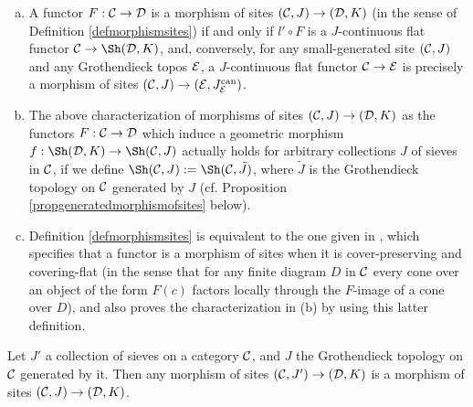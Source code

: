 \documentclass[a4paper,12pt]{article}
\begin{document}
\begin{remarks}\label{remmorphismsofsites}
	\begin{enumerate}[(a)]
		\item A functor $F:{\cal C}\to {\cal D}$ is a morphism of sites $({\cal C}, J)\to ({\cal D}, K)$ (in the sense of Definition \ref{defmorphismsites}) if and only if $l'\circ F$ is a $J$-continuous flat functor ${\cal C}\to \Sh({\cal D}, K)$, and, conversely, for any small-generated site $({\cal C}, J)$ and any Grothendieck topos $\cal E$, a $J$-continuous flat functor ${\cal C}\to {\cal E}$ is precisely a morphism of sites $({\cal C}, J)\to ({\cal E}, J_{\cal E}^{\textup{can}})$. 
		
		\item The above characterization of morphisms of sites $({\cal C}, J)\to ({\cal D}, K)$ as the functors $F:{\cal C}\to {\cal D}$ which induce a geometric morphism $f:\Sh({\cal D}, K) \to \Sh({\cal C}, J)$ actually holds for arbitrary collections $J$ of sieves in $\cal C$, if we define $\Sh({\cal C}, J):=\Sh({\cal C}, \tilde{J})$, where $\tilde{J}$ is the Grothendieck topology on $\cal C$ generated by $J$ (cf. Proposition \ref{propgeneratedmorphismofsites} below).
		
		\item Definition \ref{defmorphismsites} is equivalent to the one given in \cite{Shulman}, which specifies that a functor is a morphism of sites when it is cover-preserving and covering-flat (in the sense that for any finite diagram $D$ in $\cal C$ every cone over an object of the form $F(c)$ factors locally through the $F$-image of a cone over $D$), and also proves the characterization in (b) by using this latter definition. 
	\end{enumerate}
\end{remarks}

\begin{proposition}\label{propgeneratedmorphismofsites}
	Let $J'$ a collection of sieves on a category $\cal C$, and $J$ the Grothendieck topology on $\cal C$ generated by it. Then any morphism of sites $({\cal C}, J')\to ({\cal D}, K)$ is a morphism of sites $({\cal C}, J)\to ({\cal D}, K)$.   
\end{proposition}
\end{document}
